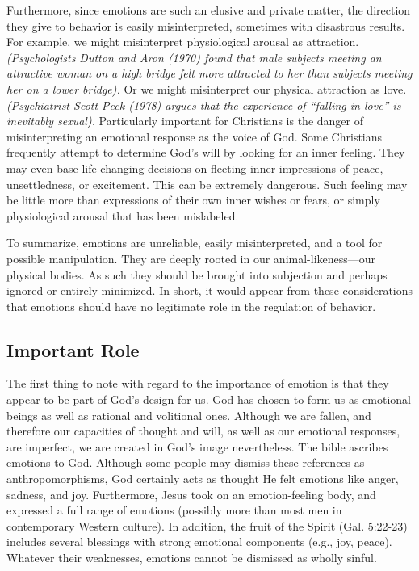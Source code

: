 \documentclass[
]{book}
\begin{document}
Furthermore, since emotions are such an elusive and private matter, the direction they give to behavior is easily misinterpreted, sometimes with disastrous results. For example, we might misinterpret physiological arousal as attraction. \emph{(Psychologists Dutton and Aron (1970) found that male subjects meeting an attractive woman on a high bridge felt more attracted to her than subjects meeting her on a lower bridge).} Or we might misinterpret our physical attraction as love. \emph{(Psychiatrist Scott Peck (1978) argues that the experience of ``falling in love'' is inevitably sexual).} Particularly important for Christians is the danger of misinterpreting an emotional response as the voice of God. Some Christians frequently attempt to determine God's will by looking for an inner feeling. They may even base life-changing decisions on fleeting inner impressions of peace, unsettledness, or excitement. This can be extremely dangerous. Such feeling may be little more than expressions of their own inner wishes or fears, or simply physiological arousal that has been mislabeled.

To summarize, emotions are unreliable, easily misinterpreted, and a tool for possible manipulation. They are deeply rooted in our animal-likeness---our physical bodies. As such they should be brought into subjection and perhaps ignored or entirely minimized. In short, it would appear from these considerations that emotions should have no legitimate role in the regulation of behavior.

\hypertarget{important-role}{%
\subsection*{Important Role}\label{important-role}}

The first thing to note with regard to the importance of emotion is that they appear to be part of God's design for us. God has chosen to form us as emotional beings as well as rational and volitional ones. Although we are fallen, and therefore our capacities of thought and will, as well as our emotional responses, are imperfect, we are created in God's image nevertheless. The bible ascribes emotions to God. Although some people may dismiss these references as anthropomorphisms, God certainly acts as thought He felt emotions like anger, sadness, and joy. Furthermore, Jesus took on an emotion-feeling body, and expressed a full range of emotions (possibly more than most men in contemporary Western culture). In addition, the fruit of the Spirit (Gal. 5:22-23) includes several blessings with strong emotional components (e.g., joy, peace). Whatever their weaknesses, emotions cannot be dismissed as wholly sinful.
\end{document}
